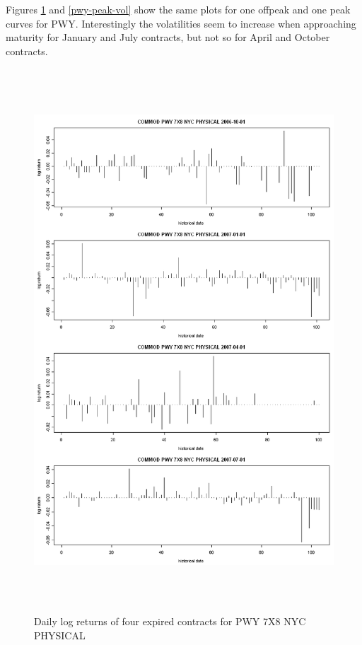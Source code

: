 Figures \ref{pwy-offpeak-vol} and \ref{pwy-peak-vol} 
show the same plots for one offpeak and one peak curves for PWY. 
Interestingly the volatilities seem to increase when approaching maturity
for January and July contracts, but not so for April and October contracts.
\begin{figure}[htbp]
\centering
\includegraphics[width=6in, height=8in]{figures/pwy-offpeak-vol.png}
\caption{Daily log returns of four expired contracts for PWY 7X8 NYC PHYSICAL}
\label{pwy-offpeak-vol}
\end{figure}

